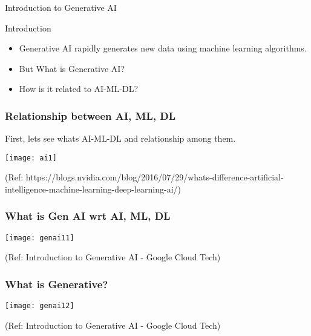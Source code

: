 \begin{frame}[fragile]\frametitle{}
\begin{center}
{\Large Introduction to Generative AI}
\end{center}
\end{frame}

\begin{frame}[fragile]{Introduction}
\begin{itemize}
\item Generative AI rapidly generates new data using machine learning algorithms.
\item But What is Generative AI?
\item How is it related to AI-ML-DL?
\end{itemize}
\end{frame}

\begin{frame}[fragile]\frametitle{Relationship between AI, ML, DL}

First, lets see whats AI-ML-DL and relationship among them.

\begin{center}
\texttt{[image: ai1]}
\end{center}

{\tiny (Ref: https://blogs.nvidia.com/blog/2016/07/29/whats-difference-artificial-intelligence-machine-learning-deep-learning-ai/)}

\end{frame}

\begin{frame}[fragile]\frametitle{What is Gen AI wrt AI, ML, DL}

\begin{center}
\texttt{[image: genai11]}
\end{center}

{\tiny (Ref: Introduction to Generative AI - Google Cloud Tech)}

\end{frame}

\begin{frame}[fragile]\frametitle{What is Generative?}

\begin{center}
\texttt{[image: genai12]}
\end{center}

{\tiny (Ref: Introduction to Generative AI - Google Cloud Tech)}

\end{frame}

